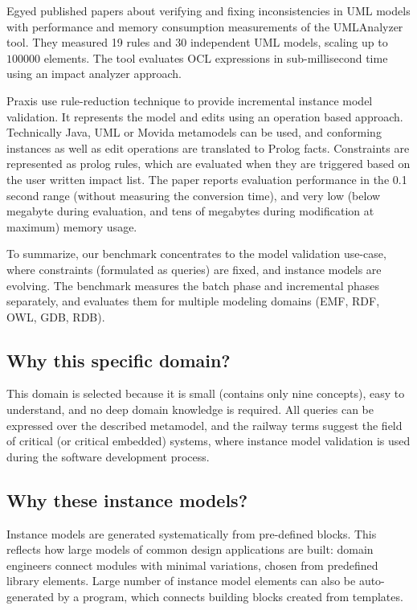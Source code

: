 Egyed published papers about verifying and fixing inconsistencies in UML models
\cite{Egyed-fixingInconsistencies, Egyed-instantConsistency} with performance
and memory consumption measurements \cite{Egyed-incConsistency} of the
UMLAnalyzer tool. They measured 19 rules and 30 independent UML models, scaling
up to $100 000$ elements. The tool evaluates OCL expressions in sub-millisecond
time using an impact analyzer approach.

Praxis \cite{falleri-praxis} use rule-reduction technique to provide incremental
instance model validation. It represents the model and edits using an operation
based approach. Technically Java, UML or Movida metamodels can be used, and
conforming instances as well as edit operations are translated to Prolog facts.
Constraints are represented as prolog rules, which are evaluated when they are
triggered based on the user written impact list. The paper reports evaluation
performance in the 0.1 second range (without measuring the conversion time), and
very low (below megabyte during evaluation, and tens of megabytes during
modification at maximum) memory usage.

To summarize, our benchmark concentrates to the model validation use-case, where
constraints (formulated as queries) are fixed, and instance models are evolving.
The benchmark measures the batch phase and incremental phases separately, and
evaluates them for multiple modeling domains (EMF, RDF, OWL, GDB, RDB).


\subsection{Why this specific domain?}
This domain is selected because it is small (contains only nine concepts), easy
to understand, and no deep domain knowledge is required. All queries can be
expressed over the described metamodel, and the railway terms suggest the field
of critical (or critical embedded) systems, where instance model validation is
used during the software development process.

\subsection{Why these instance models?}
Instance models are generated systematically from pre-defined blocks. This
reflects how large models of common design applications are built: domain
engineers connect modules with minimal variations, chosen from predefined
library elements. Large number of instance model elements can also be
auto-generated by a program, which connects building blocks created from
templates.

